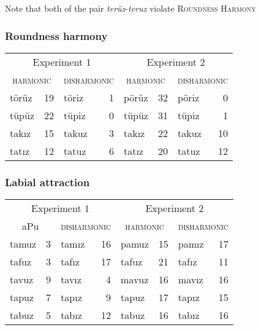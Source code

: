 
Note that both of the pair \emph{terüz}-\emph{teruz} violate \textsc{Roundness Harmony}

\subsubsection{Roundness harmony}

\begin{example}
\begin{tabular}{lrlr|lrlr}
\toprule
\multicolumn{4}{c|}{Experiment 1} & \multicolumn{4}{c}{Experiment 2} \\
\multicolumn{2}{c}{\textsc{harmonic}} & \multicolumn{2}{c|}{\textsc{disharmonic}} & \multicolumn{2}{c}{\textsc{harmonic}} & \multicolumn{2}{c}{\textsc{disharmonic}} \\
\midrule
{törüz} & 19 & {töriz} & 1 & {pörüz} & 32 & {pöriz} & 0  \\
{tüpüz} & 22 & {tüpiz} & 0 & {tüpüz} & 31 & {tüpiz} & 1  \\
{takız} & 15 & {takuz} & 3 & {takız} & 22 & {takuz} & 10 \\
{tatız} & 12 & {tatuz} & 6 & {tatız} & 20 & {tatuz} & 12 \\
\bottomrule
\end{tabular}
\end{example}


\subsubsection{Labial attraction}

\begin{example}
\begin{tabular}{lrlr|lrlr}
\toprule
\multicolumn{4}{c|}{Experiment 1} & \multicolumn{4}{c}{Experiment 2} \\
\multicolumn{2}{c}{aPu} & \multicolumn{2}{c|}{\textsc{disharmonic}} & \multicolumn{2}{c}{\textsc{harmonic}} & \multicolumn{2}{c}{\textsc{disharmonic}} \\
\midrule
{tamuz} & 3 & {tamız} & 16 & {pamuz} & 15 & {pamız} & 17 \\
{tafuz} & 3 & {tafız} & 17 & {tafuz} & 21 & {tafız} & 11 \\
{tavuz} & 9 & {tavız} & 4  & {mavuz} & 16 & {mavız} & 16 \\
{tapuz} & 7 & {tapız} & 9  & {tapuz} & 17 & {tapız} & 15 \\
{tabuz} & 5 & {tabız} & 12 & {tabuz} & 16 & {tabız} & 16 \\
\bottomrule
\end{tabular}
\end{example}



